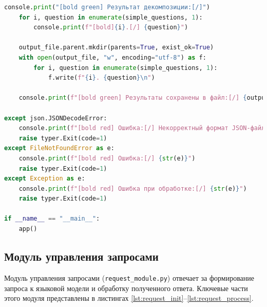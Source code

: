 \begin{lstlisting}[caption={Сохранение результатов и запуск приложения}, label=lst:cli_run, language=Python]
	console.print("[bold green] Результат декомпозиции:[/]")
	for i, question in enumerate(simple_questions, 1):
		console.print(f"[bold]{i}.[/] {question}")

	output_file.parent.mkdir(parents=True, exist_ok=True)
	with open(output_file, "w", encoding="utf-8") as f:
		for i, question in enumerate(simple_questions, 1):
			f.write(f"{i}. {question}\n")

	console.print(f"[bold green] Результаты сохранены в файл:[/] {output_file}")

except json.JSONDecodeError:
	console.print(f"[bold red] Ошибка:[/] Некорректный формат JSON-файла {config_path}")
	raise typer.Exit(code=1)
except FileNotFoundError as e:
	console.print(f"[bold red] Ошибка:[/] {str(e)}")
	raise typer.Exit(code=1)
except Exception as e:
	console.print(f"[bold red] Ошибка при обработке:[/] {str(e)}")
	raise typer.Exit(code=1)

if __name__ == "__main__":
	app()
\end{lstlisting}

\subsection{Модуль управления запросами}

Модуль управления запросами (\texttt{request\_module.py}) отвечает за формирование запроса к языковой модели и обработку полученного ответа. Ключевые части этого модуля представлены в листингах \ref{lst:request_init}--\ref{lst:request_process}.

\newpage

